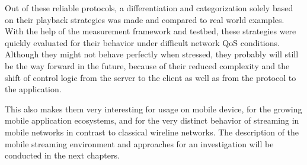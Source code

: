 Out of these reliable protocols, a differentiation and categorization solely based on their playback strategies was made and compared to real world examples. With the help of the measurement framework and testbed, these strategies were quickly evaluated for their behavior under difficult network \gls{QoS} conditions. Although they might not behave perfectly when stressed, they probably will still be the way forward in the future, because of their reduced complexity and the shift of control logic from the server to the client as well as from the protocol to the application.

This also makes them very interesting for usage on mobile device, for the growing mobile application ecosystems, and for the very distinct behavior of streaming in mobile networks in contrast to classical wireline networks. The description of the mobile streaming environment and approaches for an investigation will be conducted in the next chapters.










%

 
 

